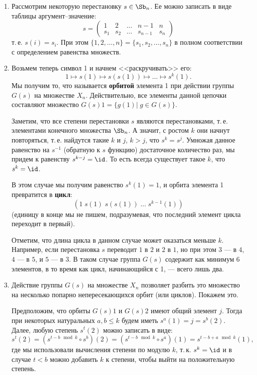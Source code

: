 \begin{enumerate}
\item Рассмотрим некоторую перестановку $s\in \Sb_n$. Ее можно записать в виде таблицы аргумент--значение:
$$
s=
\begin{pmatrix}
1 & 2 & \dots & n-1 & n \\
s_1 & s_2 & \dots & s_{n-1} & s_n
\end{pmatrix}
$$
т.\,е. $s(i)=s_i$. При этом $\{1,2,\dots,n\}=\{s_1,s_2,\dots,s_n\}$ в полном соответствии с определением равенства множеств.

\item Возьмем теперь символ 1 и начнем <<раскручивать>> его:
$$
1\mapsto s(1)\mapsto s(s(1))\mapsto\dots\mapsto s^k(1).
$$
Мы получим то, что называется \textbf{орбитой} элемента 1 при действии группы $G(s)$ на множестве $X_n$. Действительно, все элементы данной цепочки составляют множество $G(s)1=\{g(1)|\;g\in G(s)\}$.

Заметим, что все степени перестановки $s$ являются перестановками, т.\,е. элементами конечного множества $\Sb_n$. А значит, с ростом $k$ они начнут повторяться, т.\,е. найдутся такие $k$ и $j$, $k>j$, что $s^k=s^j$. Умножая данное равенство на $s^{-1}$ (обратную к $s$ функцию) достаточное количество раз, мы придем к равенству $s^{k-j}=\id$.
То есть всегда существует такое $k$, что $s^k=\id$.

В этом случае мы получим равенство $s^k(1)=1$, и орбита элемента 1 превратится в \textbf{цикл}:
$$
(1\; s(1)\; s(s(1))\;\dots\; s^{k-1}(1))
$$
(единицу в конце мы не пишем, подразумевая, что последний элемент цикла переходит в первый).

Отметим, что длина цикла в данном случае может оказаться меньше $k$. Например, если перестановка $s$ переводит $1$ в $2$ и $2$ в $1$, но при этом $3$ --- в $4$, $4$ --- в $5$, и $5$ --- в $3$. В таком случае группа $G(s)$ содержит как минимум 6 элементов, в то время как цикл, начинающийся с 1, --- всего лишь два.

\item Действие группы $G(s)$ на множестве $X_n$ позволяет разбить это множество на несколько попарно непересекающихся орбит (или циклов). Покажем это.

Предположим, что орбиты $G(s)1$ и $G(s)2$ имеют общий элемент $j$. Тогда при некоторых натуральных $a,b\le k$ будем иметь $s^a(1)=j=s^b(2)$. Далее, любую степень $s^t(2)$ можно записать в виде:
$$
s^t(2) = (s^{t-b\mod k}\circ s^b)(2) = (s^{t-b\mod k}\circ s^a)(1) = s^{t-b+a\mod k}(1),
$$
где мы использовали вычисления степени по модулю $k$, т.\,к. $s^k=\id$ и в случае $t<b$ можно добавить $k$ к степени, чтобы выйти на положительную степень.


\end{enumerate}
